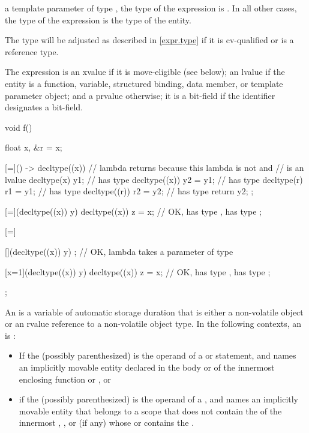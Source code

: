 a template parameter of type ,
the type of the expression is .
In all other cases, the type of the expression is the type of the entity.
\begin{note}
The type will be adjusted as described in \ref{expr.type}
if it is cv-qualified or is a reference type.
\end{note}
The expression is an xvalue if it is move-eligible (see below);
an lvalue
if the entity is a function, variable, structured binding, data member, or
template parameter object;
and a prvalue otherwise;
it is a bit-field if the identifier designates a bit-field.
\begin{example}
\begin{codeblock}
void f() {
  float x, &r = x;

  [=]() -> decltype((x)) {      // lambda returns  because this lambda is not  and
                                //  is an lvalue
    decltype(x) y1;             //  has type 
    decltype((x)) y2 = y1;      //  has type 
    decltype(r) r1 = y1;        //  has type 
    decltype((r)) r2 = y2;      //  has type 
    return y2;
  };

  [=](decltype((x)) y) {
    decltype((x)) z = x;        // OK,  has type ,  has type 
  };

  [=] {
    [](decltype((x)) y) {};     // OK, lambda takes a parameter of type 

    [x=1](decltype((x)) y) {
      decltype((x)) z = x;      // OK,  has type ,  has type 
    };
  };
}
\end{codeblock}
\end{example}

\pnum
An  is
a variable of automatic storage duration
that is either a non-volatile object or
an rvalue reference to a non-volatile object type.
In the following contexts,
an  is :
\begin{itemize}
\item
If the  (possibly parenthesized)
is the operand of a  or
 statement,
and names an implicitly movable entity declared in the body
or  of the innermost enclosing
function or , or
\item
if the  (possibly parenthesized)
is the operand of a ,
and names an implicitly movable entity
that belongs to a scope that does not contain the 
of the innermost
,
, or
 (if any)
whose  or 
contains the .
\end{itemize}

